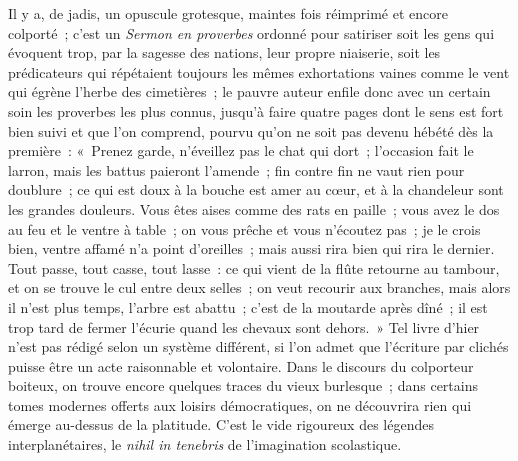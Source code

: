 \documentclass[french,twoside]{book} %
\begin{document}
Il y a, de jadis, un opuscule grotesque, maintes fois réimprimé et encore colporté ; c’est un {\itshape Sermon en proverbes} ordonné pour satiriser soit les gens qui évoquent trop, par la sagesse des nations, leur propre niaiserie, soit les prédicateurs qui répétaient toujours les mêmes exhortations vaines comme le vent qui égrène l’herbe des cimetières ; le pauvre auteur enfile donc avec un certain soin les proverbes les plus connus, jusqu’à faire quatre pages dont le sens est fort bien suivi et que l’on comprend, pourvu qu’on ne soit pas devenu hébété dès la première : « Prenez garde, n’éveillez pas le chat qui dort ; l’occasion fait le larron, mais les battus paieront l’amende ; fin contre fin ne vaut rien pour doublure ; ce qui est doux à la bouche est amer au cœur, et à la chandeleur sont les grandes douleurs. Vous êtes aises comme des rats en paille ; vous avez le dos au feu et le ventre à table ; on vous prêche et vous n’écoutez pas ; je le crois bien, ventre affamé n’a point d’oreilles ; mais aussi rira bien qui rira le dernier. Tout passe, tout casse, tout lasse : ce qui vient de la flûte retourne au tambour, et on se trouve le cul entre deux selles ; on veut recourir aux branches, mais alors il n’est plus temps, l’arbre est abattu ; c’est de la moutarde après dîné ; il est trop tard de fermer l’écurie quand les chevaux sont dehors. » Tel livre d’hier n’est pas rédigé selon un système différent, si l’on admet que l’écriture par clichés puisse être un acte raisonnable et volontaire. Dans le discours du colporteur boiteux, on trouve encore quelques traces du vieux burlesque ; dans certains tomes modernes offerts aux loisirs démocratiques, on ne découvrira rien qui émerge au-dessus de la platitude. C’est le vide rigoureux des légendes interplanétaires, le {\itshape nihil in tenebris} de l’imagination scolastique.\par
\end{document}
